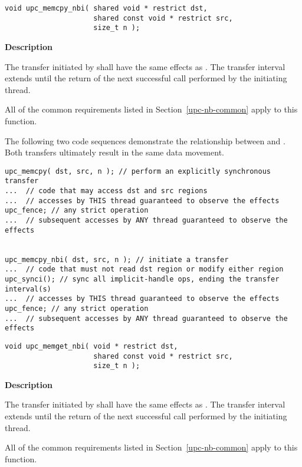 \begin{verbatim}
void upc_memcpy_nbi( shared void * restrict dst,
                     shared const void * restrict src, 
                     size_t n );
\end{verbatim}

{\bf Description}

\np The transfer initiated by \func\args shall have the same effects as \sfunc\args.
The transfer interval extends until the return of the next successful 
\synci call performed by the initiating thread.

\np All of the common requirements listed in Section~\ref{upc-nb-common} apply to this function.

\np The following two code sequences demonstrate the relationship between
\sfunc and \func. Both transfers ultimately result in the same data movement.

\begin{verbatim}
upc_memcpy( dst, src, n ); // perform an explicitly synchronous transfer
...  // code that may access dst and src regions
...  // accesses by THIS thread guaranteed to observe the effects
upc_fence; // any strict operation
...  // subsequent accesses by ANY thread guaranteed to observe the effects


upc_memcpy_nbi( dst, src, n ); // initiate a transfer 
...  // code that must not read dst region or modify either region
upc_synci(); // sync all implicit-handle ops, ending the transfer interval(s)
...  // accesses by THIS thread guaranteed to observe the effects
upc_fence; // any strict operation
...  // subsequent accesses by ANY thread guaranteed to observe the effects
\end{verbatim}
\vfill

\def\bfunc{upc\_memget\_nbi}
\def\sfunc{\memget}
\funcheader

\begin{verbatim}
void upc_memget_nbi( void * restrict dst, 
                     shared const void * restrict src, 
                     size_t n );
\end{verbatim}

{\bf Description}

\np The transfer initiated by \func\args shall have the same effects as \sfunc\args.
The transfer interval extends until the return of the next successful 
\synci call performed by the initiating thread.

\np All of the common requirements listed in Section~\ref{upc-nb-common} apply to this function.

